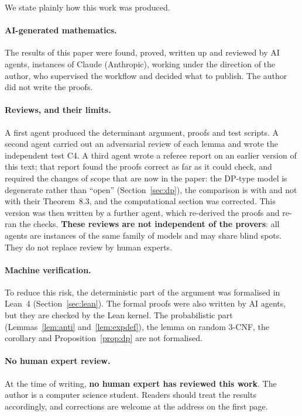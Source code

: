 \documentclass[11pt,a4paper]{article}
\theoremstyle{definition}
\theoremstyle{remark}
\begin{document}
We state plainly how this work was produced.

\paragraph{AI-generated mathematics.} The results of this paper were found, proved, written
up and reviewed by AI agents, instances of Claude (Anthropic), working under the direction of
the author, who supervised the workflow and decided what to publish. The author did not
write the proofs.

\paragraph{Reviews, and their limits.} A first agent produced the determinant argument,
proofs and test scripts. A second agent carried out an adversarial review of each lemma and
wrote the independent test C4. A third agent wrote a referee report on an earlier version of
this text; that report found the proofs correct as far as it could check, and required the
changes of scope that are now in the paper: the DP-type model is degenerate rather than
``open'' (Section~\ref{sec:dp}), the comparison is with \cite[Theorem~8.1 and Lemma~8.2]{DL}
and not with their Theorem~8.3, and the computational section was corrected. This version
was then written by a further agent, which re-derived the proofs and re-ran the checks.
\textbf{These reviews are not independent of the provers}: all agents are instances of the
same family of models and may share blind spots. They do not replace review by human
experts.

\paragraph{Machine verification.} To reduce this risk, the deterministic part of the
argument was formalised in Lean~4 (Section~\ref{sec:lean}). The formal proofs were also
written by AI agents, but they are checked by the Lean kernel. The probabilistic part
(Lemmas~\ref{lem:anti} and~\ref{lem:expdef}), the lemma on random 3-CNF, the corollary and
Proposition~\ref{prop:dp} are not formalised.

\paragraph{No human expert review.} At the time of writing, \textbf{no human expert has
reviewed this work}. The author is a computer science student. Readers should treat the
results accordingly, and corrections are welcome at the address on the first page.
\end{document}
